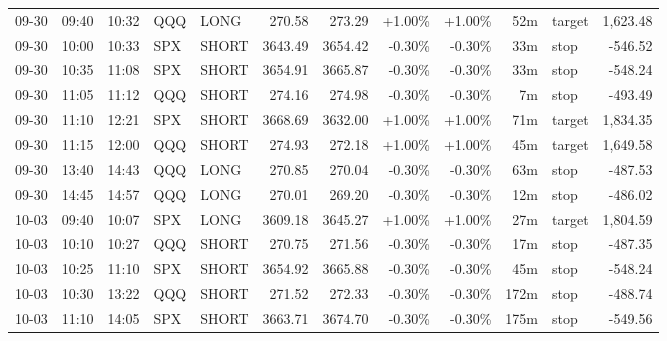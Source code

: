 \documentclass[11pt,a4paper,twoside]{article}
\begin{document}
\begin{center}
\begin{longtable}{>{\color{txtmain}}l l l l l r r r r r >{\color{txtmain}}l r}
09-30 & 09:40 & 10:32 & QQQ & LONG & 270.58 & 273.29 & \textcolor{wingreen}{+1.00\%} & \textcolor{wingreen}{+1.00\%} & 52m & target & \textcolor{wingreen}{1,623.48} \\
09-30 & 10:00 & 10:33 & SPX & SHORT & 3643.49 & 3654.42 & \textcolor{lossred}{-0.30\%} & \textcolor{lossred}{-0.30\%} & 33m & stop & \textcolor{lossred}{-546.52} \\
09-30 & 10:35 & 11:08 & SPX & SHORT & 3654.91 & 3665.87 & \textcolor{lossred}{-0.30\%} & \textcolor{lossred}{-0.30\%} & 33m & stop & \textcolor{lossred}{-548.24} \\
09-30 & 11:05 & 11:12 & QQQ & SHORT & 274.16 & 274.98 & \textcolor{lossred}{-0.30\%} & \textcolor{lossred}{-0.30\%} & 7m & stop & \textcolor{lossred}{-493.49} \\
09-30 & 11:10 & 12:21 & SPX & SHORT & 3668.69 & 3632.00 & \textcolor{wingreen}{+1.00\%} & \textcolor{wingreen}{+1.00\%} & 71m & target & \textcolor{wingreen}{1,834.35} \\
09-30 & 11:15 & 12:00 & QQQ & SHORT & 274.93 & 272.18 & \textcolor{wingreen}{+1.00\%} & \textcolor{wingreen}{+1.00\%} & 45m & target & \textcolor{wingreen}{1,649.58} \\
09-30 & 13:40 & 14:43 & QQQ & LONG & 270.85 & 270.04 & \textcolor{lossred}{-0.30\%} & \textcolor{lossred}{-0.30\%} & 63m & stop & \textcolor{lossred}{-487.53} \\
09-30 & 14:45 & 14:57 & QQQ & LONG & 270.01 & 269.20 & \textcolor{lossred}{-0.30\%} & \textcolor{lossred}{-0.30\%} & 12m & stop & \textcolor{lossred}{-486.02} \\
10-03 & 09:40 & 10:07 & SPX & LONG & 3609.18 & 3645.27 & \textcolor{wingreen}{+1.00\%} & \textcolor{wingreen}{+1.00\%} & 27m & target & \textcolor{wingreen}{1,804.59} \\
10-03 & 10:10 & 10:27 & QQQ & SHORT & 270.75 & 271.56 & \textcolor{lossred}{-0.30\%} & \textcolor{lossred}{-0.30\%} & 17m & stop & \textcolor{lossred}{-487.35} \\
10-03 & 10:25 & 11:10 & SPX & SHORT & 3654.92 & 3665.88 & \textcolor{lossred}{-0.30\%} & \textcolor{lossred}{-0.30\%} & 45m & stop & \textcolor{lossred}{-548.24} \\
10-03 & 10:30 & 13:22 & QQQ & SHORT & 271.52 & 272.33 & \textcolor{lossred}{-0.30\%} & \textcolor{lossred}{-0.30\%} & 172m & stop & \textcolor{lossred}{-488.74} \\
10-03 & 11:10 & 14:05 & SPX & SHORT & 3663.71 & 3674.70 & \textcolor{lossred}{-0.30\%} & \textcolor{lossred}{-0.30\%} & 175m & stop & \textcolor{lossred}{-549.56} \\

\end{longtable}
\end{center}
\end{document}
